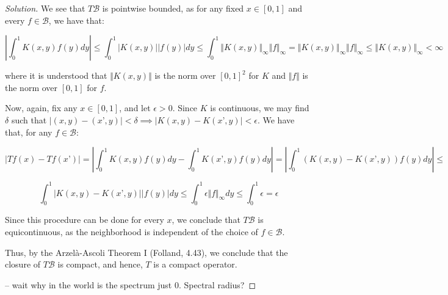\documentclass[10pt]{article}
\begin{document}
\begin{proof}[Solution]
We see that $T\mathcal{B}$ is pointwise bounded, as for any fixed $x \in [0,1]$ and every $f \in \mathcal{B}$, we have that:

$$ \left| \int_0^1 K(x,y) f(y) dy \right| \leq \int_0^1 | K(x,y)| | f(y)| dy \leq \int_0^1 \Vert K(x,y) \Vert_{\infty} \Vert f \Vert_\infty = \Vert K(x,y) \Vert_\infty \Vert f \Vert_\infty \leq \Vert K(x,y) \Vert_\infty < \infty $$

where it is understood that $\Vert K(x,y)\Vert$ is the norm over $[0,1]^2$ for $K$ and $\Vert f \Vert$ is the norm over $[0,1]$ for $f$.

Now, again, fix any $x \in [0,1]$, and let $\epsilon > 0$. Since $K$ is continuous, we may find $\delta$ such that $| (x,y) - (x’,y) | < \delta \implies | K(x,y) - K(x’, y) | < \epsilon$. We have that, for any $f \in \mathcal{B}$:

$$ | Tf(x) - Tf(x’) | = \left| \int_0^1 K(x,y) f(y) dy - \int_0^1 K(x’,y) f(y) dy \right| = \left| \int_0^1 (K(x,y) - K(x’,y)) f(y) dy \right|  \leq $$

$$ \int_0^1 | K(x,y) - K(x’, y)| |f(y)| dy \leq \int_0^1 \epsilon \Vert f \Vert_\infty dy \leq \int_0^1 \epsilon = \epsilon $$

Since this procedure can be done for every $x$, we conclude that $T\mathcal{B}$ is equicontinuous, as the neighborhood is independent of the choice of $f \in \mathcal{B}$.

Thus, by the Arzel\`{a}-Ascoli Theorem I (Folland, 4.43), we conclude that the closure of $T \mathcal{B}$ is compact, and hence, $T$ is a compact operator.

-- wait why in the world is the spectrum just 0. Spectral radius?

\end{proof}
\end{document}
